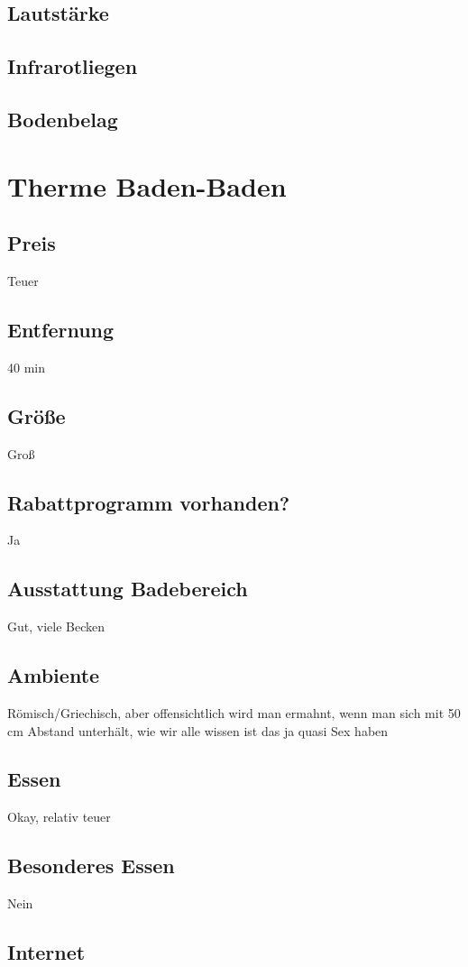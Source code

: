 \documentclass{article}
\begin{document}
\subsection*{Lautstärke}
\subsection*{Infrarotliegen}
\subsection*{Bodenbelag}

\section*{Therme Baden-Baden}
\subsection*{Preis} Teuer
\subsection*{Entfernung} 40 min
\subsection*{Größe} Groß
\subsection*{Rabattprogramm vorhanden?} Ja
\subsection*{Ausstattung Badebereich} Gut, viele Becken
\subsection*{Ambiente} Römisch/Griechisch, aber offensichtlich wird man ermahnt, wenn man sich mit 50 cm Abstand unterhält, wie wir alle wissen ist das ja quasi Sex haben
\subsection*{Essen} Okay, relativ teuer
\subsection*{Besonderes Essen} Nein
\subsection*{Internet}
\end{document}
